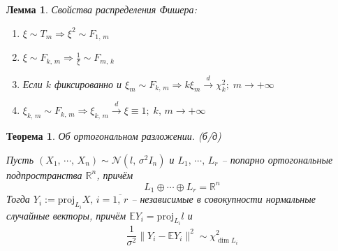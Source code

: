 \documentclass[a4paper,12pt]{article}
\theoremstyle{plain}
\newtheorem{theorem}{Теорема}[section]
\newtheorem{lemma}{Лемма}[section]
\theoremstyle{definition}
\theoremstyle{remark}
\begin{document}
\begin{lemma}
  Свойства распределения Фишера:
  \begin{enumerate}
    \item $\xi \sim T_m \Rightarrow \xi^2 \sim F_{1,\,m}$
    \item $\xi \sim F_{k,\,m} \Rightarrow \frac{1}{\xi} \sim F_{m,\,k}$
    \item Если $k$ фиксированно и $\xi_m \sim F_{k,\,m} \Rightarrow k\xi_m \overset{d}{\to} \chi^2_k;\; m \to +\infty$
    \item $\xi_{k,\,m} \sim F_{k,\,m} \Rightarrow \xi_{k,\,m} \overset{d}{\to} \xi \equiv 1;\; k,\,m \to +\infty$
  \end{enumerate}
\end{lemma}

\begin{theorem}
  Об ортогональном разложении. (б/д)

  Пусть $(X_1,\,\cdots,\,X_n) \sim \mathcal{N}(l,\,\sigma^2I_n)$ и $L_1,\,\cdots,\,L_r$ -- попарно ортогональные подпространства $\mathbb{R}^n$, причём 
  \[
    L_1\oplus\cdots\oplus L_r = \mathbb{R}^n
  \]
  Тогда $Y_i := \text{proj}_{L_i}X,\, i = \overline{1,\,r}$ -- независимые в совокупности нормальные случайные векторы, причём $\mathbb{E}Y_i = \text{proj}_{L_i}l$ и
  \[
    \frac{1}{\sigma^2}\|Y_i - \mathbb{E}Y_i\|^2 \sim \chi^2_{\dim L_i}
  \]
\end{theorem}
\end{document}
